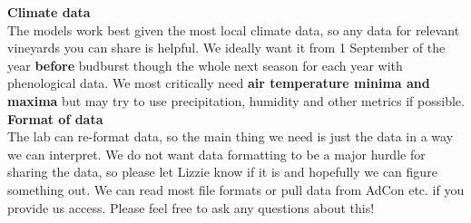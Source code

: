 \documentclass[11pt,letter]{article}
\begin{document}
{\bf Climate data}\\
The models work best given the most local climate data, so any data for relevant vineyards you can share is helpful. We ideally want it from 1 September of the year {\bf before} budburst though the whole next season for each year with phenological data. We most critically need {\bf air temperature minima and maxima} but may try to use precipitation, humidity and other metrics if possible.\\

{\bf Format of data}\\
The lab can re-format data, so the main thing we need is just the data in a way we can interpret. We do not want data formatting to be a major hurdle for sharing the data, so please let Lizzie know if it is and hopefully we can figure something out. We can read most file formats or pull data from AdCon etc. if you provide us access. Please feel free to ask any questions about this! 
\end{document}

